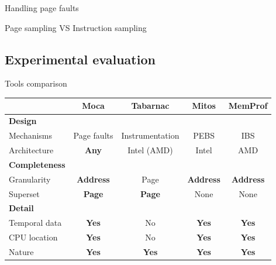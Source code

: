 \documentclass[xcolor={usenames,dvipsnames},hyperref={pdfusetitle}]{beamer}
\begin{document}
\begin{frame}{Handling page faults}
    \centering
    \resizebox{!}{.8\textheight}{
        
    }
\end{frame}

\begin{frame}{Page sampling VS Instruction sampling}
    \centering
    \pause
    \pause
\end{frame}

\subsection{Experimental evaluation}

\begin{frame}{Tools comparison}
    \small
    \begin{tabular}{lcccc}
        \toprule
         & \textbf{Moca} & \textbf{Tabarnac} & \textbf{Mitos} & \textbf{MemProf} \\
            \midrule
            \textbf{Design} & & & &\\
            \midrule
            Mechanisms   & Page faults  & Instrumentation & PEBS & IBS \\
            Architecture & \textbf{Any} & Intel (AMD) & Intel & AMD   \\
            \midrule
            \textbf{Completeness} & & & &\\
            \midrule
            Granularity & \textbf{Address} & Page          & \textbf{Address} & \textbf{Address} \\
            Superset          & \textbf{Page} & \textbf{Page} & None             & None             \\
            \midrule
            \textbf{Detail} & & & &\\
            \midrule
            Temporal data & \textbf{Yes} & No          & \textbf{Yes} & \textbf{Yes} \\
            CPU location  & \textbf{Yes} & No          & \textbf{Yes} & \textbf{Yes} \\
            Nature        & \textbf{Yes} &\textbf{Yes} & \textbf{Yes} &\textbf{Yes}  \\
        \bottomrule
    \end{tabular}
\end{frame}
\end{document}
